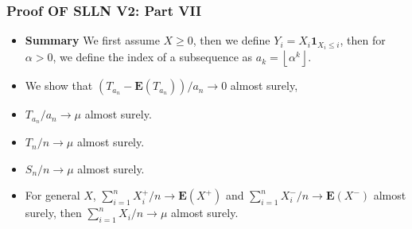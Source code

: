\documentclass[handout]{beamer}
\newcommand{\BE}{\mathbf{E}}
\newcommand{\BI}{\mathbf{1}}
\begin{document}
\frame
{
  \frametitle{Proof OF SLLN V2: Part VII}

   \begin{itemize}
   \item<1-> \textbf{Summary} We first assume $X\geq 0$, then we define $Y_i=X_i \BI_{X_i\leq i}$, then for $\alpha>0$, we define the index of a subsequence as $a_k=\left \lfloor{\alpha^k}\right \rfloor$. 
   
      \item<2->[1)] We show that $ (T_{a_n}-\BE(T_{a_n}) )/a_n \rightarrow 0$ almost surely,
      
       \item<3->[2)] $T_{a_n}/a_n \rightarrow \mu$ almost surely.  

          \item<4->[3)]  $T_{n}/n \rightarrow \mu$ almost surely.  
          
                    \item<5->[4)]  $S_{n}/n \rightarrow \mu$ almost surely.  
                    
                          \item<6->[5)] For general $X$, $\sum_{i=1}^n X_{i}^+/n \rightarrow \BE(X^+)$ and $\sum_{i=1}^n  X_{i}^-/n \rightarrow \BE(X^-)$ almost surely, then $ \sum_{i=1}^nX_{i}/n \rightarrow \mu$ almost surely.                                                                 
\end{itemize}
}
\end{document}

